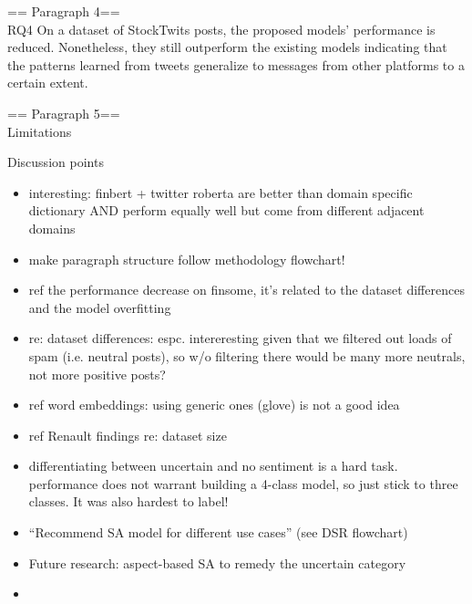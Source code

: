 == Paragraph 4==\\
RQ4
On a dataset of StockTwits posts, the proposed models' performance is reduced. Nonetheless, they still outperform the existing models indicating that the patterns learned from tweets generalize to messages from other platforms to a certain extent.


== Paragraph 5==\\
Limitations










\newpage
Discussion points
\begin{itemize}[noitemsep]
	\item interesting: finbert + twitter roberta are better than domain specific dictionary AND perform equally well but come from different adjacent domains
	\item make paragraph structure follow methodology flowchart!
	\item ref the performance decrease on finsome, it's related to the dataset differences and the model overfitting
	\item re: dataset differences: espc. intereresting given that we filtered out loads of spam (i.e. neutral posts), so w/o filtering there would be many more neutrals, not more positive posts?
	\item ref word embeddings: using generic ones (glove) is not a good idea
	\item ref Renault findings re: dataset size
	\item differentiating between uncertain and no sentiment is a hard task. performance does not warrant building a 4-class model, so just stick to three classes. It was also hardest to label!
	\item ``Recommend SA model for different use cases'' (see DSR flowchart)
	\item Future research: aspect-based SA to remedy the uncertain category
	\item 
\end{itemize}